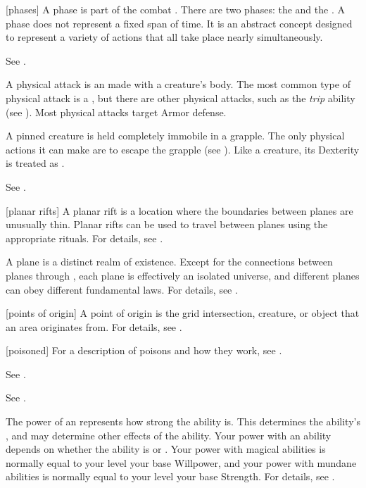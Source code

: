 [phases] A phase is part of the combat .
There are two phases: the  and the .
A phase does not represent a fixed span of time.
It is an abstract concept designed to represent a variety of actions that all take place nearly simultaneously.

 See .

 A physical attack is an  made with a creature's body.
The most common type of physical attack is a , but there are other physical attacks, such as the \textit{trip} ability (see ).
Most physical attacks target Armor defense.

 A pinned creature is held completely immobile in a grapple.
The only physical actions it can make are to escape the grapple (see ).
Like a  creature, its Dexterity is treated as .

 See .

[planar rifts] A planar rift is a location where the boundaries between planes are unusually thin.
Planar rifts can be used to travel between planes using the appropriate rituals.
For details, see .

 A plane is a distinct realm of existence.
Except for the connections between planes through , each plane is effectively an isolated universe, and different planes can obey different fundamental laws.
For details, see .

[points of origin] A point of origin is the grid intersection, creature, or object that an area originates from.
For details, see .

[poisoned] For a description of poisons and how they work, see .

 See .

 See .

 The power of an  represents how strong the ability is.
This determines the ability's , and may determine other effects of the ability.
Your power with an ability depends on whether the ability is  or .
Your power with magical abilities is normally equal to your level \add your base Willpower, and your power with mundane abilities is normally equal to your level \add your base Strength.
For details, see .

